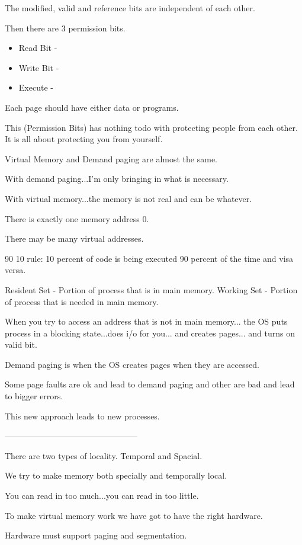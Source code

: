 \documentclass{article}
\begin{document}
The modified, valid and reference bits are independent of each other.

Then there are 3 permission bits.

\begin{itemize}
\item Read Bit - 
\item Write Bit - 
\item Execute - 
\end{itemize}

Each page should have either data or programs.

This (Permission Bits) has nothing todo with protecting people from each other.
It is all about protecting you from yourself.

Virtual Memory and Demand paging are almost the same.

With demand paging...I'm only bringing in what is necessary.

With virtual memory...the memory is not real and can be whatever.

There is exactly one memory address 0.

There may be many virtual addresses. 

90 10 rule:
10 percent of code is being executed 90 percent of the time and visa versa.

Resident Set - Portion of process that is in main memory.
Working Set - Portion of process that is needed in main memory.

When you try to access an address that is not in main memory...
the OS puts process in a blocking state...does i/o for you...
and creates pages...
and turns on valid bit.

Demand paging is when the OS creates pages when they are accessed.

Some page faults are ok and lead to demand paging and other are bad and lead to bigger errors.

This new approach leads to new processes.

------------------------------------------------

There are two types of locality.
Temporal and Spacial.

We try to make memory both specially and temporally local.

You can read in too much...you can read in too little.

To make virtual memory work we have got to have the right hardware.

Hardware must support paging and segmentation.
\end{document}
